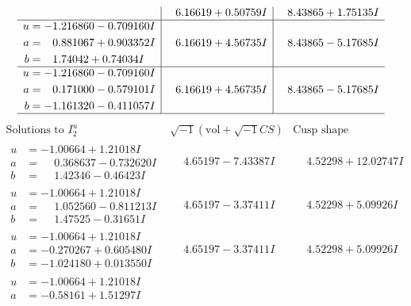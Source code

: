 \documentclass[1p]{elsarticle_modified}
\theoremstyle{definition}
\newcommand{\I}{\sqrt{-1}}
\begin{document}
$$\begin{array}{c|c|c}
 & \phantom{-}6.16619 + 0.50759 I & \phantom{-}8.43865 + 1.75135 I \\ \hline\begin{aligned}
u &= -1.216860 - 0.709160 I \\
a &= \phantom{-}0.881067 + 0.903352 I \\
b &= \phantom{-}1.74042 + 0.74034 I\end{aligned}
 & \phantom{-}6.16619 + 4.56735 I & \phantom{-}8.43865 - 5.17685 I \\ \hline\begin{aligned}
u &= -1.216860 - 0.709160 I \\
a &= \phantom{-}0.171000 - 0.579101 I \\
b &= -1.161320 - 0.411057 I\end{aligned}
 & \phantom{-}6.16619 + 4.56735 I & \phantom{-}8.43865 - 5.17685 I\\
 \hline 
 \end{array}$$\newpage$$\begin{array}{c|c|c}  
\text{Solutions to }I^u_{2}& \I (\text{vol} + \sqrt{-1}CS) & \text{Cusp shape}\\
 \hline 
\begin{aligned}
u &= -1.00664 + 1.21018 I \\
a &= \phantom{-}0.368637 - 0.732620 I \\
b &= \phantom{-}1.42346 - 0.46423 I\end{aligned}
 & \phantom{-}4.65197 - 7.43387 I & \phantom{-}4.52298 + 12.02747 I \\ \hline\begin{aligned}
u &= -1.00664 + 1.21018 I \\
a &= \phantom{-}1.052560 - 0.811213 I \\
b &= \phantom{-}1.47525 - 0.31651 I\end{aligned}
 & \phantom{-}4.65197 - 3.37411 I & \phantom{-}4.52298 + 5.09926 I \\ \hline\begin{aligned}
u &= -1.00664 + 1.21018 I \\
a &= -0.270267 + 0.605480 I \\
b &= -1.024180 + 0.013550 I\end{aligned}
 & \phantom{-}4.65197 - 3.37411 I & \phantom{-}4.52298 + 5.09926 I \\ \hline\begin{aligned}
u &= -1.00664 + 1.21018 I \\
a &= -0.58161 + 1.51297 I \\

\end{aligned}
\end{array}$$
\end{document}
